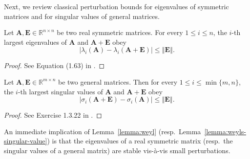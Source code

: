 Next, we review classical perturbation
bounds for eigenvalues of symmetric matrices and for singular values of general matrices. 

\begin{lemma}
\label{lemma:weyl}
Let $\bm{A},\bm{E}\in\mathbb{R}^{n\times n}$ be two real symmetric matrices.
	For every $1\leq i\leq n$, the $i$-th largest eigenvalues of $\bm{A}$ and $\bm{A}+\bm{E}$ obey
%
\begin{equation}
	\left|\lambda_{i}\left(\bm{A}\right)-\lambda_{i}\left(\bm{A} +\bm{E}\right)\right|\leq\left\Vert \bm{E}\right\Vert .
	\label{eq:weyl}
\end{equation}
%
\end{lemma}
\begin{proof}See Equation (1.63) in \citet{Tao2012RMT}. \end{proof}



\begin{lemma}
\label{lemma:weyls-singular-value}
Let $\bm{A},\bm{E}\in\mathbb{R}^{m\times n}$ be two general matrices.
Then for every $1\leq i\leq \min\{m,n\}$, the $i$-th largest singular values of $\bm{A}$ and $\bm{A}+\bm{E}$ obey 
%
\[
	\left|\sigma_{i}\left(\bm{A}+\bm{E}\right)-\sigma_{i}\left(\bm{A}\right)\right|\leq\left\Vert \bm{E}\right\Vert .
\]
%
\end{lemma}
\begin{proof}See Exercise 1.3.22 in \citet{Tao2012RMT}. \end{proof}



An immediate implication of Lemma~\ref{lemma:weyl} (resp.~Lemma~\ref{lemma:weyls-singular-value}) is that the eigenvalues of a real symmetric matrix (resp.~the singular values of a general matrix) 
 are stable vis-\`a-vis small perturbations. 





